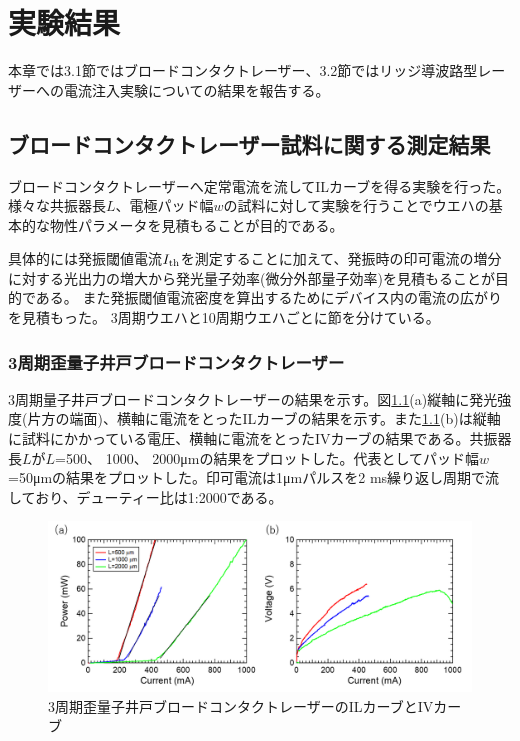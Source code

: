 \chapter{実験結果}
本章では3.1節ではブロードコンタクトレーザー、3.2節ではリッジ導波路型レーザーへの電流注入実験についての結果を報告する。
\section{ブロードコンタクトレーザー試料に関する測定結果}%
ブロードコンタクトレーザーへ定常電流を流してILカーブを得る実験を行った。様々な共振器長$L$、電極パッド幅$w$の試料に対して実験を行うことでウエハの基本的な物性パラメータを見積もることが目的である。

具体的には発振閾値電流$I_{\rm{th}}$を測定することに加えて、発振時の印可電流の増分に対する光出力の増大から発光量子効率(微分外部量子効率)を見積もることが目的である。
また発振閾値電流密度を算出するためにデバイス内の電流の広がりを見積もった。
3周期ウエハと10周期ウエハごとに節を分けている。
\subsection{3周期歪量子井戸ブロードコンタクトレーザー}%
3周期量子井戸ブロードコンタクトレーザーの結果を示す。図\ref{fig:fig_3_1_3QW_broacdcontact_IL}(a)縦軸に発光強度(片方の端面)、横軸に電流をとったILカーブの結果を示す。また\ref{fig:fig_3_1_3QW_broacdcontact_IL}(b)は縦軸に試料にかかっている電圧、横軸に電流をとったIVカーブの結果である。共振器長$L$が$L$=500、 1000、 2000\si{ \micro\metre}の結果をプロットした。代表としてパッド幅$w$=50\si{ \micro\metre}の結果をプロットした。印可電流は1\si{ \micro\metre}パルスを2 ms繰り返し周期で流しており、デューティー比は1:2000である。

\begin{figure}[h]
	\centering
	\includegraphics[width=15cm]{figure/fig_3_1_3QW_broadcontact_IL.png}
		\caption{3周期歪量子井戸ブロードコンタクトレーザーのILカーブとIVカーブ}
		\label{fig:fig_3_1_3QW_broacdcontact_IL}
\end{figure}


